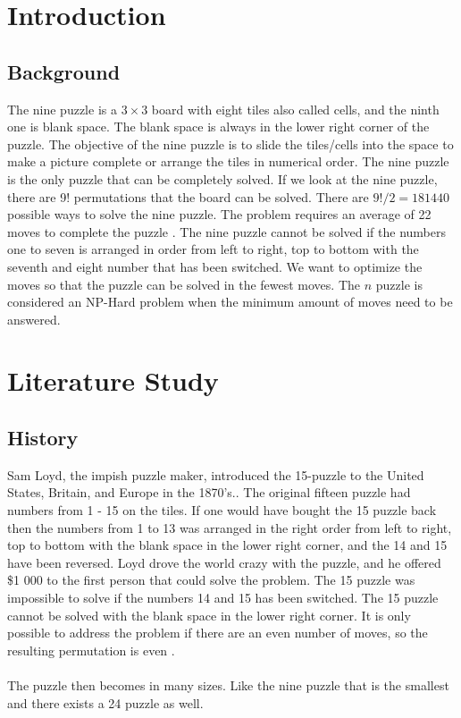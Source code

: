 \documentclass[10pt]{article}
\begin{document}

\tableofcontents
\pagebreak
\section{Introduction}
\subsection{Background}
The nine puzzle is a $3 \times 3$ board with eight tiles also called cells, and the ninth one is blank space. The blank space is always in the lower right corner of the puzzle. The objective of the nine puzzle is to slide the tiles/cells into the space to make a picture complete or arrange the tiles in numerical order. The nine puzzle is the only puzzle that can be completely solved. If we look at the nine puzzle, there are 9! permutations that the board can be solved\cite{reinefeld1993complete}. There are $9!/2 = 181 440$ possible ways to solve the nine puzzle. The problem requires an average of 22 moves to complete the puzzle \cite{reinefeld1993complete}.  The nine puzzle cannot be solved if the numbers one to seven is arranged in order from left to right, top to bottom with the seventh and eight number that has been switched. 
We want to optimize the moves so that the puzzle can be solved in the fewest moves. The $n$ puzzle is considered an NP-Hard problem when the minimum amount of moves need to be answered.
\section{Literature Study}
\subsection{History}
Sam Loyd, the impish puzzle maker, introduced the 15-puzzle to the United States, Britain, and Europe in the 1870's.\cite{archer1999modern}.  The original fifteen puzzle had numbers from 1 - 15 on the tiles.  If one would have bought the 15 puzzle back then the numbers from 1 to 13 was arranged in the right order from left to right, top to bottom with the blank space in the lower right corner, and the 14 and 15 have been reversed. Loyd drove the world crazy with the puzzle, and he offered \$1 000 to the first person that could solve the problem. The 15 puzzle was impossible to solve if the numbers 14 and 15 has been switched. The 15 puzzle cannot be solved with the blank space in the lower right corner.  It is only possible to address the problem if there are an even number of moves, so the resulting permutation is even \cite{archer1999modern}.
\\
\\The puzzle then becomes in many sizes.  Like the nine puzzle that is the smallest and there exists a 24 puzzle as well.
\end{document}
